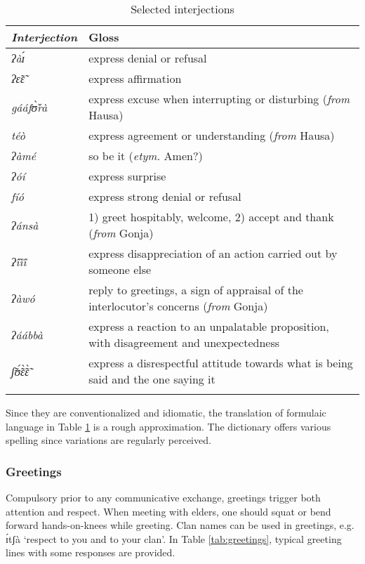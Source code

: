 \begin{exe}
\begin{exe}
\begin{exe}
{\begin{exe}
\begin{exe}
\begin{exe}
\begin{exe}
\begin{exe}
\begin{exe}
\begin{exe}
\begin{exe}
\begin{exe}
\begin{exe}
\begin{exe}
\begin{exe}
\begin{exe}
\begin{exe}
\begin{exe}
\begin{exe}
\begin{exe}
\begin{exe}
\begin{exe}
\begin{exe}
\begin{exe}
\begin{table}[!htb]
\small
\centering
\caption{Selected interjections \label{tab:GRM-interj}}

\begin{tabular}{>{\slshape}lp{8cm}}
\lsptoprule
{\rm Interjection} & Gloss\\[1ex] \midrule
ʔàɪ́  &  express denial or refusal\\
ʔɛ̃ɛ̃ & express affirmation\\
gááfʊ̆̀rà    &  express excuse when interrupting or disturbing  ({\it from}  Hausa)\\
téò  &  express agreement or understanding  ({\it from}  Hausa)\\
ʔàmé   & so be it  ({\it etym.}  Amen?)\\
ʔóí  &  express surprise\\
fíó  &  express strong denial or refusal\\
ʔánsà  &  1) greet hospitably, welcome, 2) accept and thank ({\it from} Gonja)\\
ʔĩ́ĩ̀ĩ́  &  express disappreciation of an action
carried out by someone else\\
ʔàwó  &  reply to greetings, a sign of appraisal of the interlocutor's
concerns ({\it from} Gonja)\\
 ʔáábbà & express a  reaction to an unpalatable proposition, with disagreement and 
unexpectedness\\
ʃ̃ʊ̃́ɛ̃̀ɛ̃̀  &  express a disrespectful attitude towards what is being said and the 
one saying it \\
\lspbottomrule
\end{tabular}
\end{table}



Since they are conventionalized and idiomatic, the translation of  formulaic 
language in Table \ref{tab:GRM-interj}  is
 a rough  approximation. The dictionary offers various spelling since variations are 
regularly perceived.



\subsubsection{Greetings}
\label{sec:GRM-greet}

Compulsory prior to any communicative exchange, greetings trigger
both attention and respect. When meeting with elders, one should  squat or bend
forward hands-on-knees  while greeting. Clan names can be used in greetings,
e.g. {\sls ɪ́tʃà} `respect to you and to your clan'. In Table
\ref{tab:greetings},  typical greeting lines with some responses are provided.



\end{exe}
\end{exe}
\end{exe}
\end{exe}
\end{exe}
\end{exe}
\end{exe}
\end{exe}
\end{exe}
\end{exe}
\end{exe}
\end{exe}
\end{exe}
\end{exe}
\end{exe}
\end{exe}
\end{exe}
\end{exe}
\end{exe}
\end{exe}
\end{exe}}
\end{exe}
\end{exe}
\end{exe}

